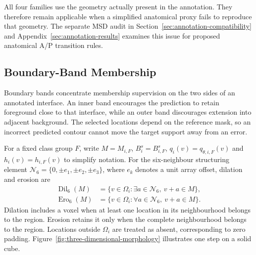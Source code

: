 \documentclass[12pt,a4paper]{article}
\begin{document}
All four families use the geometry actually present in the annotation.
They therefore remain applicable when a simplified anatomical proxy
fails to reproduce that geometry. The separate MSD audit in
Section~\ref{sec:annotation-compatibility} and Appendix~\ref{sec:annotation-results}
examines this issue for proposed anatomical A/P transition rules.

\subsection{Boundary-Band Membership}\label{sec:boundary-band-constraints}

Boundary bands concentrate membership supervision on the two sides of an
annotated interface. An inner band encourages the prediction to retain
foreground close to that interface, while an outer band discourages
extension into adjacent background. The selected locations depend on the
reference mask, so an incorrect predicted contour cannot move the target
support away from an error.

For a fixed class group $F$, write $M=M_{i,F}$, $B_i^s=B_{i,F}^s$,
$q_i(v)=q_{\theta,i,F}(v)$ and $h_i(v)=h_{i,F}(v)$ to simplify notation.
For the six-neighbour structuring element
$\mathcal N_6=\{0,\pm e_1,\pm e_2,\pm e_3\}$, where $e_k$ denotes
a unit array offset, dilation and erosion are
\begin{equation}
\begin{aligned}
\operatorname{Dil}_6(M)
 &=\{v\in\Omega_i:\exists a\in\mathcal{N}_6,\ v+a\in M\},\\
\operatorname{Ero}_6(M)
 &=\{v\in\Omega_i:\forall a\in\mathcal{N}_6,\ v+a\in M\}.
\end{aligned}
\label{eq:band-morphology}
\end{equation}
Dilation includes a voxel when at least one location in its neighbourhood
belongs to the region. Erosion retains it only when the complete
neighbourhood belongs to the region. Locations outside $\Omega_i$ are
treated as absent, corresponding to zero padding.
Figure~\ref{fig:three-dimensional-morphology} illustrates one step on
a solid cube.
\end{document}
